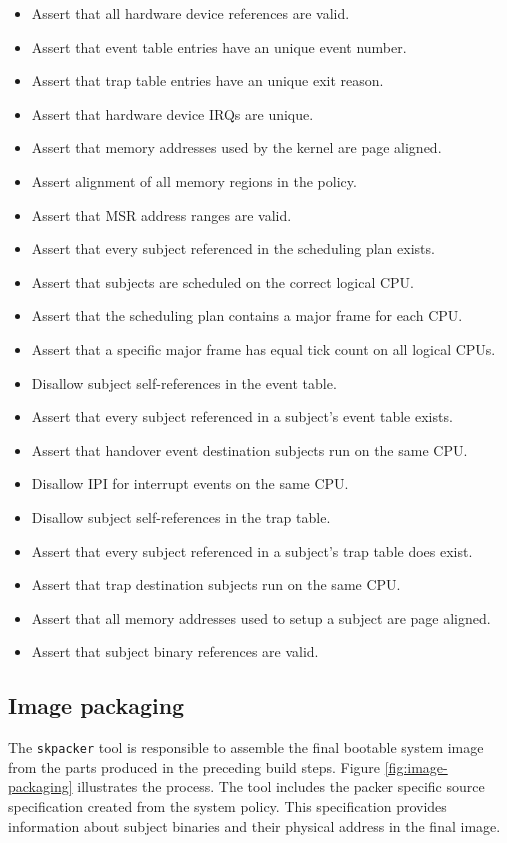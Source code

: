 \begin{itemize}
	\item Assert that all hardware device references are valid.
	\item Assert that event table entries have an unique event number.
	\item Assert that trap table entries have an unique exit reason.
	\item Assert that hardware device IRQs are unique.
	\item Assert that memory addresses used by the kernel are page aligned.
	\item Assert alignment of all memory regions in the policy.
	\item Assert that MSR address ranges are valid.
	\item Assert that every subject referenced in the scheduling plan exists.
	\item Assert that subjects are scheduled on the correct logical CPU.
	\item Assert that the scheduling plan contains a major frame for each CPU.
	\item Assert that a specific major frame has equal tick count on all logical
		CPUs.
	\item Disallow subject self-references in the event table.
	\item Assert that every subject referenced in a subject's event table exists.
	\item Assert that handover event destination subjects run on the same CPU.
	\item Disallow IPI for interrupt events on the same CPU.
	\item Disallow subject self-references in the trap table.
	\item Assert that every subject referenced in a subject's trap table does
		exist.
	\item Assert that trap destination subjects run on the same CPU.
	\item Assert that all memory addresses used to setup a subject are page
		aligned.
	\item Assert that subject binary references are valid.
\end{itemize}

\subsection{Image packaging}\label{subsec:image-packaging}
The \texttt{skpacker} tool is responsible to assemble the final bootable system
image from the parts produced in the preceding build steps. Figure
\ref{fig:image-packaging} illustrates the process. The tool includes the packer
specific source specification created from the system policy. This specification
provides information about subject binaries and their physical address in the
final image.

